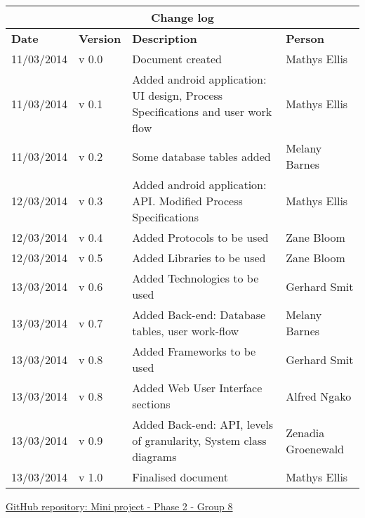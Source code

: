 \documentclass[12pt]{article}
\begin{document}
		\begin{center}
		\begin{tabular}{|l|p{1.4cm}|p{8cm}|p{2.8cm}|}
		\hline
		\multicolumn{4}{|c|}{\bf Change log} \\
		\hline
		\bf Date & \bf Version & \bf Description & \bf Person \\
		\hline
		11/03/2014 & v 0.0 & Document created & Mathys Ellis \\
		\hline
		11/03/2014 & v 0.1 & Added android application: UI design, Process Specifications and user work flow & Mathys Ellis \\
		\hline
		11/03/2014 & v 0.2 & Some database tables added & Melany Barnes \\
		\hline
		12/03/2014 & v 0.3 & Added android application: API. Modified Process Specifications & Mathys Ellis \\
		\hline
		12/03/2014 & v 0.4 & Added Protocols to be used & Zane Bloom \\
		\hline
		12/03/2014 & v 0.5 & Added Libraries to be used & Zane Bloom \\
		\hline
		13/03/2014 & v 0.6 & Added Technologies to be used & Gerhard Smit \\
		\hline
		13/03/2014 & v 0.7 & Added Back-end: Database tables, user work-flow & Melany Barnes \\
		\hline
		13/03/2014 & v 0.8 & Added Frameworks to be used & Gerhard Smit \\
		\hline
		13/03/2014 & v 0.8 & Added Web User Interface sections & Alfred Ngako \\
		\hline
		13/03/2014 & v 0.9 & Added Back-end: API, levels of granularity, System class diagrams & Zenadia Groenewald \\
		\hline
		13/03/2014 & v 1.0 & Finalised document & Mathys Ellis \\
		\hline
		
		
		\end{tabular}
		\end{center}
	\begin{flushleft}
		\LARGE\href{https://github.com/mox1990/COS_301_GROUP8_Phase_2}{GitHub repository: Mini project - Phase 2 -  Group 8}
	\end{flushleft}	
	\newpage
	\tableofcontents
	
	\listoffigures	
	
	\vspace{0.5in}
	
	
	
\end{document}
